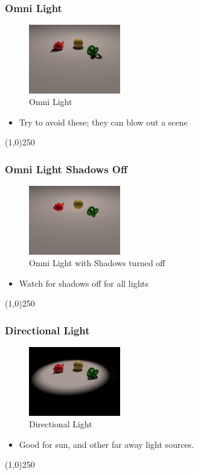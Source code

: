 \begin{frame}
	\frametitle{Omni Light}
	\begin{figure}
		\centering
		\includegraphics[height=3cm]{./Lights/OmniLight}
		\caption{Omni Light}
		\label{fig:OmniLight}
	\end{figure}
	\begin{itemize}
		\item Try to avoid these; they can blow out a scene
	\end{itemize}
\end{frame}
\begin{center}\line(1,0){250}\end{center}


\begin{frame}
	\frametitle{Omni Light Shadows Off}
	\begin{figure}
		\centering
		\includegraphics[height=3cm]{./Lights/OmniLightShadowsOff}
		\caption{Omni Light with Shadows turned off}
		\label{fig:OmniLightShadowsOff}
	\end{figure}
	\begin{itemize}
		\item Watch for shadows off for all lights
	\end{itemize}
\end{frame}
\begin{center}\line(1,0){250}\end{center}



\begin{frame}
	\frametitle{Directional Light}
	\begin{figure}
		\centering
		\includegraphics[height=3cm]{./Lights/DirectionalLight}
		\caption{Directional Light}
		\label{fig:DirectionalLight}
	\end{figure}
	\begin{itemize}
		\item Good for sun, and other far away light sources.
	\end{itemize}
\end{frame}
\begin{center}\line(1,0){250}\end{center}


